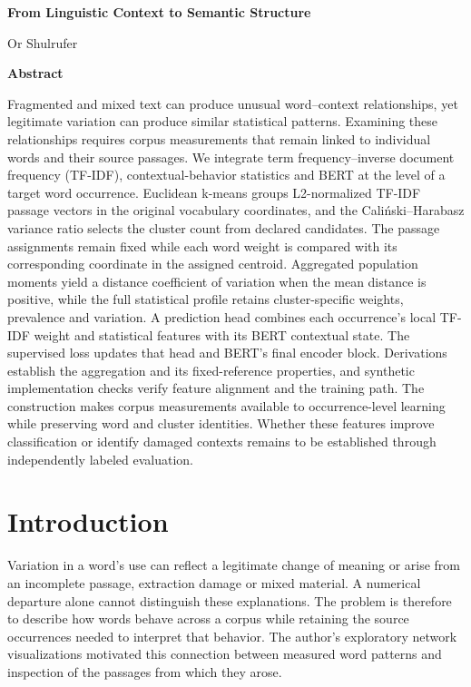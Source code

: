 \documentclass[10pt,letterpaper]{article}
\begin{document}
\begin{center}
{\bfseries\fontsize{22}{26}\selectfont From Linguistic Context to Semantic Structure\par}
\vspace{7pt}
{\fontsize{11}{14}\selectfont Or Shulrufer\par}
\end{center}


\begin{center}\textbf{\small Abstract}\end{center}
\begingroup\fontsize{9}{11}\selectfont
Fragmented and mixed text can produce unusual word–context relationships, yet legitimate variation can produce similar statistical patterns. Examining these relationships requires corpus measurements that remain linked to individual words and their source passages. We integrate term frequency–inverse document frequency (TF-IDF), contextual-behavior statistics and BERT at the level of a target word occurrence. Euclidean k-means groups L2-normalized TF-IDF passage vectors in the original vocabulary coordinates, and the Caliński–Harabasz variance ratio selects the cluster count from declared candidates. The passage assignments remain fixed while each word weight is compared with its corresponding coordinate in the assigned centroid. Aggregated population moments yield a distance coefficient of variation when the mean distance is positive, while the full statistical profile retains cluster-specific weights, prevalence and variation. A prediction head combines each occurrence's local TF-IDF weight and statistical features with its BERT contextual state. The supervised loss updates that head and BERT's final encoder block. Derivations establish the aggregation and its fixed-reference properties, and synthetic implementation checks verify feature alignment and the training path. The construction makes corpus measurements available to occurrence-level learning while preserving word and cluster identities. Whether these features improve classification or identify damaged contexts remains to be established through independently labeled evaluation.\par

\endgroup
\section{Introduction}
Variation in a word's use can reflect a legitimate change of meaning or arise from an incomplete passage, extraction damage or mixed material. A numerical departure alone cannot distinguish these explanations. The problem is therefore to describe how words behave across a corpus while retaining the source occurrences needed to interpret that behavior. The author's exploratory network visualizations motivated this connection between measured word patterns and inspection of the passages from which they arose.\par
\end{document}
